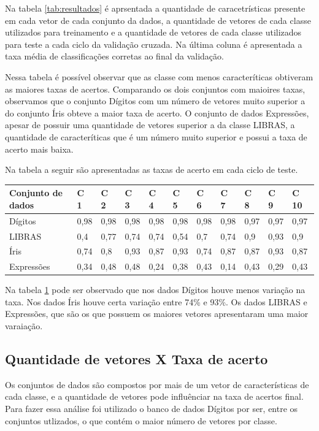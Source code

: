 Na tabela \ref{tab:resultados} é aprsentada a quantidade de caracetrísticas presente em cada vetor de cada conjunto da dados, a quantidade de vetores de cada classe utilizados para treinamento e a quantidade de vetores de cada classe utilizados para teste a cada ciclo da validação cruzada. Na última coluna é apresentada a taxa média de classificações corretas ao final da validação.

Nessa tabela é possível observar que as classe com menos caracteríticas obtiveram as maiores taxas de acertos. Comparando os dois conjuntos com maioires taxas, observamos que o conjunto Dígitos com um número de vetores muito superior a do conjunto Íris obteve a maior taxa de acerto. O conjunto de dados Expressões, apesar de possuir uma quantidade de vetores superior a da classe LIBRAS, a quantidade de caracteríticas que é um número muito superior e possui a taxa de acerto mais baixa. 

Na tabela a seguir são apresentadas as taxas de acerto em cada ciclo de teste.

\begin{table}[h!]
	\begin{tabular}{|l|l|l|l|l|l|l|l|l|l|l|}
        \hline
	Conjunto de dados  & C 1 & C 2 & C 3 & C 4 & C 5 & C 6 & C 7 & C 8 & C 9 & C 10 \\ \hline
    	Dígitos   & 0,98 & 0,98 & 0,98 & 0,98 & 0,98 & 0,98 & 0,98 & 0,97 & 0,97 & 0,97\\ \hline
   	LIBRAS    & 0,4  & 0,77 & 0,74 & 0,74 & 0,54 & 0,7  & 0,74 & 0,9  & 0,93 & 0,9 \\ \hline
    	Íris      & 0,74 & 0,8  & 0,93 & 0,87 & 0,93 & 0,74 & 0,87 & 0,87 & 0,93 & 0,87\\ \hline
    	Expressões& 0,34 & 0,48 & 0,48 & 0,24 & 0,38 & 0,43 & 0,14 & 0,43 & 0,29 & 0,43\\ \hline
	\end{tabular}
	\label{tab:taxas}
\end{table}

Na tabela \ref{tab:taxas} pode ser observado que nos dados Dígitos houve menos variação na taxa. Nos dados Íris houve certa variação entre 74\% e 93\%. Os dados LIBRAS e Expressões, que são os que possuem os maiores vetores apresentaram uma maior varaiação. 

\subsection{Quantidade de vetores X Taxa de acerto}
Os conjuntos de dados são compostos por mais de um vetor de características de cada classe, e a quantidade de vetores pode influênciar na taxa de acertos final. Para fazer essa análise foi utilizado o banco de dados Dígitos por ser, entre os conjuntos utlizados, o que contém o maior número de vetores por classe.

